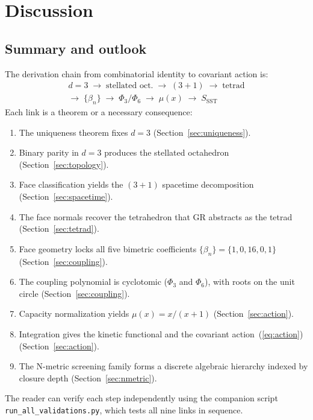 \documentclass[twocolumn]{iopjournal}
\begin{document}
\section{Discussion}
\label{sec:discussion}

\subsection{Summary and outlook}

The derivation chain from combinatorial identity to covariant action is:
\begin{gather*}
d\!=\!3 \;\to\; \text{stellated oct.} \;\to\; (3\!+\!1) \;\to\; \text{tetrad} \\
\to\; \{\beta_n\} \;\to\; \Phi_3/\Phi_6 \;\to\; \mu(x) \;\to\; S_\text{SST}
\end{gather*}
Each link is a theorem or a necessary consequence:
\begin{enumerate}
\item The uniqueness theorem fixes $d = 3$ (Section~\ref{sec:uniqueness}).
\item Binary parity in $d = 3$ produces the stellated octahedron (Section~\ref{sec:topology}).
\item Face classification yields the $(3+1)$ spacetime decomposition (Section~\ref{sec:spacetime}).
\item The face normals recover the tetrahedron that GR abstracts as the tetrad (Section~\ref{sec:tetrad}).
\item Face geometry locks all five bimetric coefficients $\{\beta_n\} = \{1, 0, 16, 0, 1\}$ (Section~\ref{sec:coupling}).
\item The coupling polynomial is cyclotomic ($\Phi_3$ and $\Phi_6$), with roots on the unit circle (Section~\ref{sec:coupling}).
\item Capacity normalization yields $\mu(x) = x/(x+1)$ (Section~\ref{sec:action}).
\item Integration gives the kinetic functional and the covariant action~(\ref{eq:action}) (Section~\ref{sec:action}).
\item The N-metric screening family forms a discrete algebraic hierarchy indexed by closure depth (Section~\ref{sec:nmetric}).
\end{enumerate}
The reader can verify each step independently using the companion script \texttt{run\_all\_validations.py}, which tests all nine links in sequence.
\end{document}
